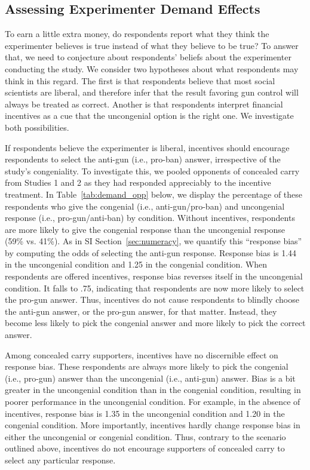 \documentclass[12pt, letterpaper]{article}
\begin{document}
\clearpage
\subsection{Assessing Experimenter Demand Effects}
\label{sec:demand}

To earn a little extra money, do respondents report what they think the experimenter believes is true instead of what they believe to be true? To answer that, we need to conjecture about respondents' beliefs about the experimenter conducting the study. We consider two hypotheses about what respondents may think in this regard. The first is that respondents believe that most social scientists are liberal, and therefore infer that the result favoring gun control will always be treated as correct. Another is that respondents interpret financial incentives as a cue that the uncongenial option is the right one. We investigate both possibilities.

If respondents believe the experimenter is liberal, incentives should encourage respondents to select the anti-gun (i.e., pro-ban) answer, irrespective of the study's congeniality. To investigate this, we pooled opponents of concealed carry from Studies 1 and 2 as they had responded appreciably to the incentive treatment. In Table~\ref{tab:demand_opp} below, we display the percentage of these respondents who give the congenial (i.e., anti-gun/pro-ban) and uncongenial response (i.e., pro-gun/anti-ban) by condition. Without incentives, respondents are more likely to give the congenial response than the uncongenial response (59\% vs. 41\%). As in SI Section~\ref{sec:numeracy}, we quantify this ``response bias'' by computing the odds of selecting the anti-gun response. Response bias is 1.44 in the uncongenial condition and 1.25 in the congenial condition. When respondents are offered incentives, response bias reverses itself in the uncongenial condition. It falls to .75, indicating that respondents are now more likely to select the pro-gun answer. Thus, incentives do not cause respondents to blindly choose the anti-gun answer, or the pro-gun answer, for that matter. Instead, they become less likely to pick the congenial answer and more likely to pick the correct answer.

Among concealed carry supporters, incentives have no discernible effect on response bias. These respondents are always more likely to pick the congenial (i.e., pro-gun) answer than the uncongenial  (i.e., anti-gun) answer. Bias is a bit greater in the uncongenial condition than in the congenial condition, resulting in poorer performance in the uncongenial condition. For example, in the absence of incentives, response bias is 1.35 in the uncongenial condition and 1.20 in the congenial condition. More importantly, incentives hardly change response bias in either the uncongenial or congenial condition. Thus, contrary to the scenario outlined above, incentives do not encourage supporters of concealed carry to select any particular response.
\end{document}
